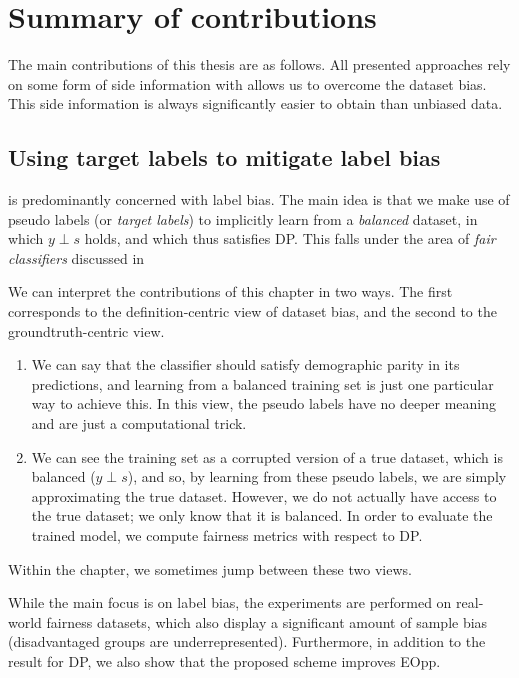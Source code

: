 \chapter{Summary of contributions}\label{ch:content}
The main contributions of this thesis are as follows.
All presented approaches rely on some form of side information with allows us to overcome the dataset bias.
This side information is always significantly easier to obtain than unbiased data.

\section{Using target labels to mitigate label bias}\label{sec:target-labels}
 is predominantly concerned with label bias.
The main idea is that we make use of pseudo labels (or \emph{target labels})
to implicitly learn from a \emph{balanced} dataset,
in which \(y\perp s\) holds, and which thus satisfies \acf{DP}.
This falls under the area of \emph{fair classifiers} discussed in 

We can interpret the contributions of this chapter in two ways.
The first corresponds to the definition-centric view of dataset bias,
and the second to the groundtruth-centric view.
\begin{enumerate}
  \item
    We can say that the classifier should satisfy demographic parity in its predictions,
    and learning from a balanced training set is just one particular way to achieve this.
    In this view, the pseudo labels have no deeper meaning and are just a computational trick.
  \item
    We can see the training set as a corrupted version of a true dataset, which is balanced (\(y\perp s\)),
    and so, by learning from these pseudo labels, we are simply approximating the true dataset.
    However, we do not actually have access to the true dataset; we only know that it is balanced.
    In order to evaluate the trained model, we compute fairness metrics with respect to \ac{DP}.
\end{enumerate}
Within the chapter, we sometimes jump between these two views.

While the main focus is on label bias,
the experiments are performed on real-world fairness datasets,
which also display a significant amount of sample bias (disadvantaged groups are underrepresented).
Furthermore, in addition to the result for \ac{DP}, we also show that the proposed scheme improves \acf{EOpp}.

